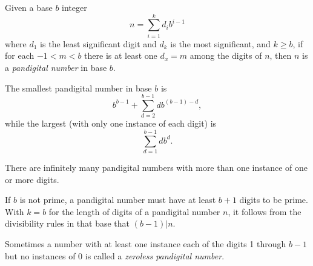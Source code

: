 \documentclass[12pt]{article}
\begin{document}
Given a base $b$ integer $$n = \sum_{i = 1}^k d_ib^{i - 1}$$ where $d_1$ is the least significant digit and $d_k$ is the most significant, and $k \ge b$, if for each $-1 < m < b$ there is at least one $d_x = m$ among the digits of $n$, then $n$ is a {\em pandigital number} in base $b$.

The smallest pandigital number in base $b$ is $$b^{b - 1} + \sum_{d = 2}^{b - 1} db^{(b - 1) - d},$$ while the largest (with only one instance of each digit) is $$\sum_{d = 1}^{b - 1} db^d.$$

There are infinitely many pandigital numbers with more than one instance of one or more digits.

If $b$ is not prime, a pandigital number must have at least $b + 1$ digits to be prime. With $k = b$ for the length of digits of a pandigital number $n$, it follows from the divisibility rules in that base that $(b - 1)|n$.

Sometimes a number with at least one instance each of the digits 1 through $b - 1$ but no instances of 0 is called a {\em zeroless pandigital number}.
\end{document}
